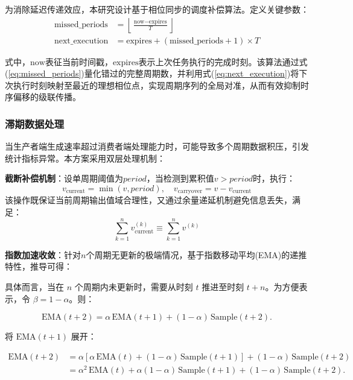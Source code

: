 为消除延迟传递效应，本研究设计基于相位同步的调度补偿算法。定义关键参数：
\begin{align}
    \text{missed\_periods} &= \left\lfloor \frac{\text{now} - \text{expires}}{T} \right\rfloor
    \label{eq:missed_periods} \\
    \text{next\_execution} &= \text{expires} + (\text{missed\_periods} + 1) \times T
    \label{eq:next_execution}
\end{align}

式中，\(\text{now}\)表征当前时间戳，\(\text{expires}\)表示上次任务执行的完成时刻。该算法通过式(\ref{eq:missed_periods})量化错过的完整周期数，并利用式(\ref{eq:next_execution})将下次执行时刻映射至最近的理想相位点，实现周期序列的全局对准，从而有效抑制时序偏移的级联传播。

\subsubsection{滞期数据处理}
当生产者端生成速率超过消费者端处理能力时，可能导致多个周期数据积压，引发统计指标异常。本方案采用双层处理机制：

\textbf{截断补偿机制}：设单周期阈值为\(\textit{period}\)，当检测到累积值\(v > \textit{period}\)时，执行：
\[
v_{\text{current}} = \min(v, \textit{period}), \quad v_{\text{carryover}} = v - v_{\text{current}}
\]
该操作既保证当前周期输出值域合理性，又通过余量递延机制避免信息丢失，满足：
\[
\sum_{k=1}^n v_{\text{current}}^{(k)} \equiv \sum_{k=1}^n v^{(k)}
\]

\textbf{指数加速收敛}：针对\(n\)个周期无更新的极端情况，基于指数移动平均(EMA)的递推特性，推导可得：


具体而言，当在 $n$ 个周期内未更新时，需要从时刻 $t$ 推进至时刻 $t+n$。为方便表示，令 $\beta = 1-\alpha$。则：

\begin{equation}
\text{EMA}(t+2) = \alpha \,\text{EMA}(t+1) + (1-\alpha) \,\text{Sample}(t+2).
\end{equation}

将 $\text{EMA}(t+1)$ 展开：

\begin{equation}
\begin{aligned}
\text{EMA}(t+2)
&= \alpha \left[\alpha\,\text{EMA}(t) + (1-\alpha)\,\text{Sample}(t+1)\right] + (1-\alpha)\,\text{Sample}(t+2) \\
&= \alpha^2 \,\text{EMA}(t) + \alpha (1-\alpha)\,\text{Sample}(t+1) + (1-\alpha)\,\text{Sample}(t+2).
\end{aligned}
\end{equation}

